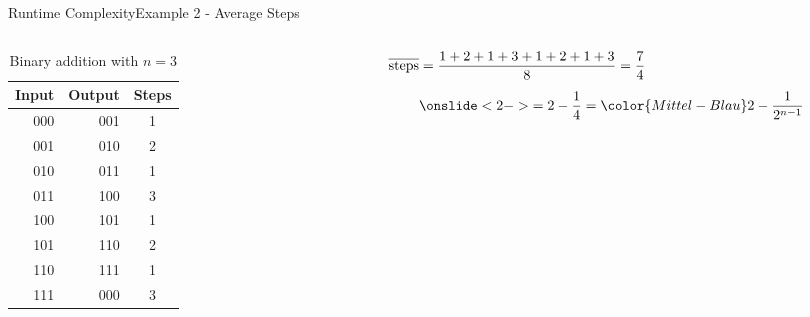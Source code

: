 
\begin{frame}{Runtime Complexity}{Example 2 - Average Steps}
  \vspace{-3em}
  \begin{columns}
    \begin{column}{0.5\linewidth}
      \begin{table}[!h]%
        \caption{Binary addition with $n=3$}%
        \label{tab:runtime:binary_addition_three}%
        \begin{tabular}{rrc}%
          Input & Output & Steps\\
          \midrule
          000 & 001 & 1\\
          001 & 010 & 2\\
          010 & 011 & 1\\
          011 & 100 & 3\\
          \midrule
          100 & 101 & 1\\
          101 & 110 & 2\\
          110 & 111 & 1\\
          111 & 000 & 3
        \end{tabular}
      \end{table}
    \end{column}
    \begin{column}{0.5\linewidth}
      \begin{align*}
        \overline{\text{steps}}
          &= \frac{1+2+1+3+1+2+1+3}{8} = \frac{7}{4}\\[0.5em]
   {} &\onslide<2->{= 2 - \frac{1}{4} = {\color{Mittel-Blau}2 - \frac{1}{2^{n-1}}}}
      \end{align*}\\
    \end{column}
  \end{columns}
\end{frame}


